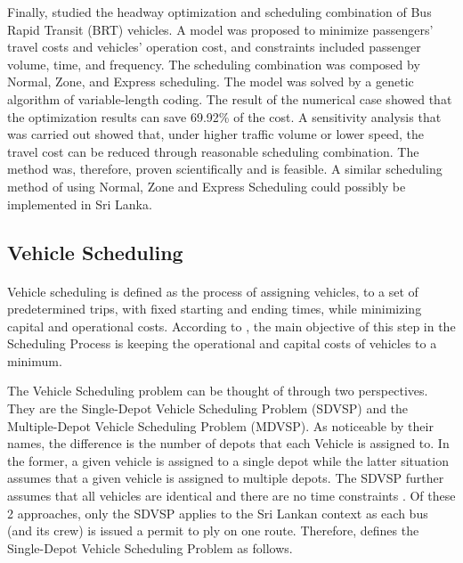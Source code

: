 \documentclass[12pt, oneside]{report}
\begin{document}
Finally, \citet{Sun2008} studied the headway optimization and scheduling combination of Bus Rapid Transit (BRT) vehicles. A model was proposed to minimize passengers' travel costs and vehicles' operation cost, and constraints included passenger volume, time, and frequency. The scheduling combination was composed by Normal, Zone, and Express scheduling. The model was solved by a genetic algorithm of variable-length coding. The result of the numerical case showed that the optimization results can save 69.92\% of the cost. A sensitivity analysis that was carried out showed that, under higher traffic volume or lower speed, the travel cost can be reduced through reasonable scheduling combination. The method was, therefore, proven scientifically and is feasible. A similar scheduling method of using Normal, Zone and Express Scheduling could possibly be implemented in Sri Lanka.

\subsection{Vehicle Scheduling}

\paragraph{ } Vehicle scheduling is defined as the process of assigning vehicles, to a set of predetermined trips, with fixed starting and ending times, while minimizing capital and operational costs. According to \citet{Freling2003}, the main objective of this step in the Scheduling Process is keeping the operational and capital costs of vehicles to a minimum.

The Vehicle Scheduling problem can be thought of through two perspectives. They are the Single-Depot Vehicle Scheduling Problem (SDVSP) and the Multiple-Depot Vehicle Scheduling Problem (MDVSP). As noticeable by their names, the difference is the number of depots that each Vehicle is assigned to. In the former, a given vehicle is assigned to a single depot while the latter situation assumes that a given vehicle is assigned to multiple depots. The SDVSP further assumes that all vehicles are identical and there are no time constraints \citep{Huisman2004}. Of these 2 approaches, only the SDVSP applies to the Sri Lankan context as each bus (and its crew) is issued a permit to ply on one route. Therefore, \citet{Freling2003} defines the Single-Depot Vehicle Scheduling Problem as follows.
\end{document}
